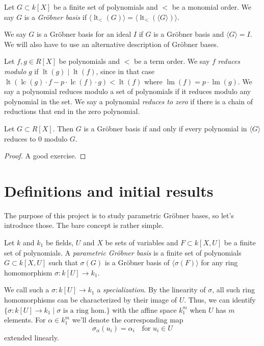 \documentclass[a4paper, 12pt]{article}
\DeclareMathOperator{\LT}{lt}
\DeclareMathOperator{\LM}{lm}
\DeclareMathOperator{\LC}{lc}
\theoremstyle{changedot}
\theoremstyle{changedotbreak}
\theoremstyle{nonumberplain}
\newtheorem{proof}{Proof}
\begin{document}
\begin{definition}
  Let $G \subset k[X]$ be a finite set of polynomials and $<$ be a monomial order. We say $G$ is a \textit{Gröbner basis} if
  $\langle \LT_{<}(G) \rangle = \langle \LT_{<}(\langle G \rangle ) \rangle $.
\end{definition}

We say $G$ is a Gröbner basis for an ideal $I$ if $G$ is a Gröbner basis and $\langle G \rangle = I$. We will also have to use an alternative description of Gröbner bases.

\begin{definition}
  Let $f, g \in R[X]$ be polynomials and $<$ be a term order. We say $f$ \textit{reduces modulo} $g$ if $\LT(g) \mid \LT(f)$, since in that case $\LT(\LC(g)\cdot f - p\cdot \LC(f) \cdot g) < \LT(f)$ where $\LM(f) = p \cdot \LM(g)$. We say a polynomial reduces modulo a set of polynomials if it reduces modulo any polynomial in the set. We say a polynomial \textit{reduces to zero} if there is a chain of reductions that end in the zero polynomial.
\end{definition}

\begin{theorem}\label{thm:grb}
  Let $G \subset R[X]$. Then $G$ is a Gröbner basis if and only if every polynomial in $\langle G \rangle$ reduces to 0 modulo $G$.
\end{theorem}
\begin{proof}
  A good exercise.
\end{proof}


\section{Definitions and initial results}
The purpose of this project is to study parametric Gröbner bases, so let's introduce those. The bare concept is rather simple.

\begin{definition}\label{def:par_grb}
  Let $k$ and $k_{1}$ be fields, $U$ and $X$ be sets of variables and $F \subset k[X, U]$ be a finite set of polynomials. A \textit{parametric Gröbner basis} is a finite set of polynomials $G \subset k[X, U]$ such that $\sigma(G)$ is a Gröbner basis of $\langle \sigma(F) \rangle$ for any ring homomorphism $\sigma : k[U] \to k_{1}$.
\end{definition}

We call such a $\sigma : k[U] \to k_{1}$ a \textit{specialization}. By the linearity of $\sigma$, all such ring homomorphisms can be characterized by their image of $U$. Thus, we can identify $\{\sigma : k[U] \to k_{1} \mid \sigma \text{ is a ring hom.}\}$ with the affine space $k_{1}^{m}$ when $U$ has $m$ elements. For $\alpha \in k_{1}^{m}$ we'll denote the corresponding map
\[\sigma_{\alpha}(u_{i}) = \alpha_{i} \quad \text{for $u_{i} \in U$}\] extended linearly.
\end{document}
